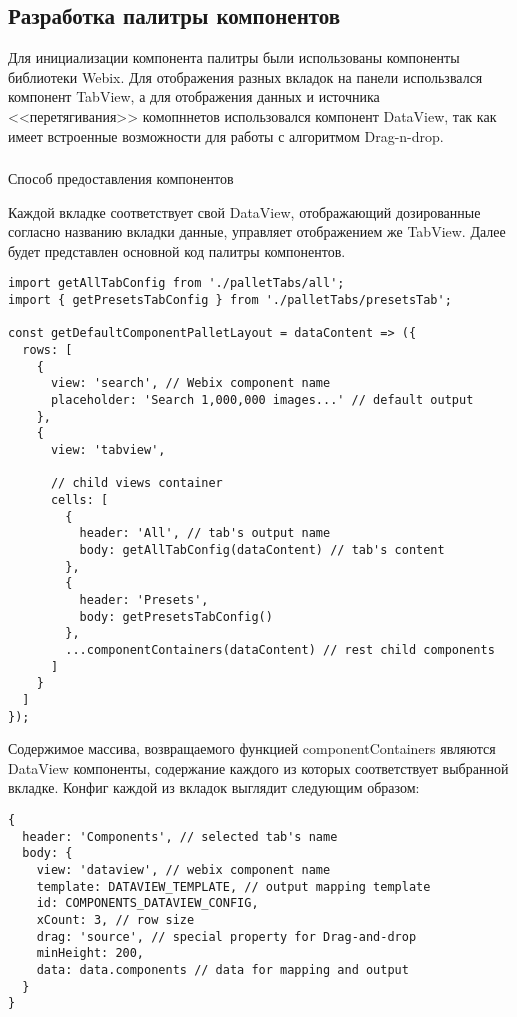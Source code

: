 \subsection{Разработка палитры компонентов}
\label{sec:development:component_palett}

Для инициализации компонента палитры были использованы компоненты библиотеки Webix. Для отображения разных вкладок на панели использвался компонент TabView, а для отображения данных и источника <<перетягивания>> комопннетов использовался компонент DataView, так как имеет встроенные возможности для работы с алгоритмом Drag-n-drop. 

\subsubsection{}Способ предоставления компонентов
\

Каждой вкладке соответствует свой DataView, отображающий дозированные согласно названию вкладки данные, управляет отображением же TabView. Далее будет представлен основной код палитры компонентов.

\begin{lstlisting}
import getAllTabConfig from './palletTabs/all';
import { getPresetsTabConfig } from './palletTabs/presetsTab';

const getDefaultComponentPalletLayout = dataContent => ({
  rows: [
    {
      view: 'search', // Webix component name
      placeholder: 'Search 1,000,000 images...' // default output
    },
    {
      view: 'tabview',

      // child views container
      cells: [
        {
          header: 'All', // tab's output name 
          body: getAllTabConfig(dataContent) // tab's content
        },
        {
          header: 'Presets',
          body: getPresetsTabConfig()
        },
        ...componentContainers(dataContent) // rest child components
      ]
    }
  ]
});
\end{lstlisting}

Содержимое массива, возвращаемого функцией componentContainers являются DataView компоненты, содержание каждого из которых соответствует выбранной вкладке. Конфиг каждой из вкладок выглядит следующим образом:

\begin{lstlisting}
{
  header: 'Components', // selected tab's name
  body: {
    view: 'dataview', // webix component name
    template: DATAVIEW_TEMPLATE, // output mapping template
    id: COMPONENTS_DATAVIEW_CONFIG,
    xCount: 3, // row size
    drag: 'source', // special property for Drag-and-drop
    minHeight: 200,
    data: data.components // data for mapping and output
  }
}
\end{lstlisting}

